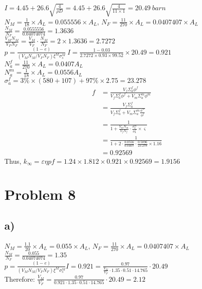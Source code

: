 \documentclass{article}
\begin{document}
\(I = 4.45+26.6\sqrt{\frac{4}{\rho D}}=4.45+26.6\sqrt{\frac{4}{11\times 1}}=20.49 \ barn \)\\
\(\displaystyle N_M= \frac{1}{18}\times A_L=0.055556\times A_L\), \(\displaystyle N_F = \frac{11}{270}\times A_L=0.0407407\times A_L\)\\
\(\displaystyle \frac {N_M}{N_F}=\frac{0.0555556}{0.04074074}=1.3636\)\\
\(\displaystyle \frac{V_MN_M}{V_FN_F}= \frac{V_M}{V_F}\cdot \frac{N_M}{N_F}=2\times 1.3636=2.7272\)
\\\(\displaystyle p =\frac{(1-e)}{(V_MN_M/V_FN_F)\xi^M\sigma^M_s }\ 
I=\frac{1-0.03}{2.7272\times 0.93\times 99.52}\times 20.49=0.921\)\\
\(N_a^f=\displaystyle \frac{11}{270}\times A_L=0.0407A_L\)\\
\(N_a^m=\displaystyle \frac{1}{18}\times A_L=0.0556 A_L\)\\
\(\sigma_a^f=3\%\times (580+107)+97\%\times 2.75=23.278\)\\
\begin{align*}
f&=\frac{V_f \Sigma_a^f \phi^f}{V_f \Sigma_a^f \phi^f + V_m \Sigma^m_a\phi^m}\\
&=\frac{V_f \Sigma_a^f}{V_f \Sigma_a^f+ V_m \Sigma^m_a\frac{\phi^m}{\phi^f}}\\
&=\frac{1}{1+\frac{V_mN_m}{V_fN_f}\cdot\frac{\sigma_a^m}{\sigma_a^f}\times \varsigma }\\
&=\frac{1}{1+2\cdot \frac{0.0556}{0.0407}\cdot \frac{0.5896}{23.278}\times 1.16}\\
&=0.92569
\end{align*}
Thus, \(k_\infty = \varepsilon \eta p f = 1.24\times 1.812\times 0.921\times 0.92569=1.9156\)\\
\newpage
\section*{Problem 8}
\subsection*{a)}

\(\displaystyle N_M= \frac{1.1}{20}\times A_L=0.055\times A_L\), \(\displaystyle N_F = \frac{11}{270}\times A_L=0.0407407\times A_L\)\\
\(\displaystyle \frac {N_M}{N_F}=\frac{0.055}{0.04074074}=1.35\)\\
\(\displaystyle p =\frac{(1-e)}{(V_MN_M/V_FN_F)\xi^M\sigma^M_s }I=0.921=\frac{0.97}{\frac{V_M}{V_F} \cdot 1.35\cdot 0.51
\cdot14.765}\cdot 20.49\)\\
Therefore: \(\displaystyle \frac{V_M}{V_F}=\frac{0.97}{0.921 \cdot 1.35\cdot 0.51\cdot 14.765}\cdot 20.49=2.12\)\\
\end{document}
